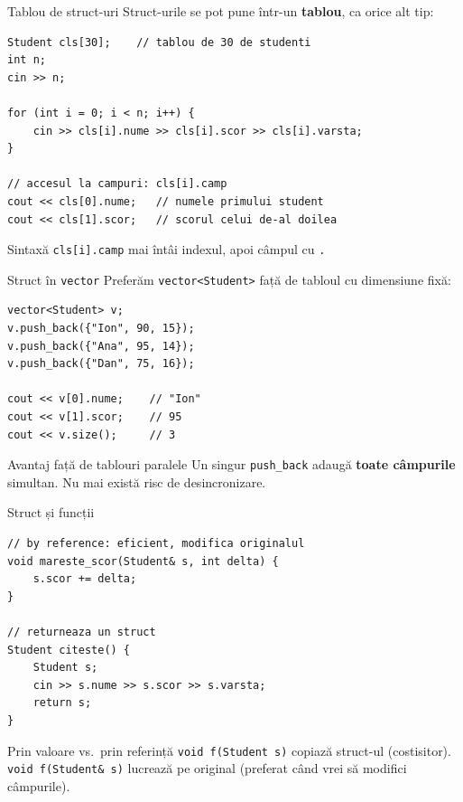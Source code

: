 ﻿\documentclass{beamer}
\begin{document}
\begin{frame}[fragile]{Tablou de struct-uri}
  Struct-urile se pot pune într-un \textbf{tablou}, ca orice alt tip:

  \begin{lstlisting}
Student cls[30];    // tablou de 30 de studenti
int n;
cin >> n;

for (int i = 0; i < n; i++) {
    cin >> cls[i].nume >> cls[i].scor >> cls[i].varsta;
}

// accesul la campuri: cls[i].camp
cout << cls[0].nume;   // numele primului student
cout << cls[1].scor;   // scorul celui de-al doilea
  \end{lstlisting}

  \begin{block}{Sintaxă}
    \texttt{cls[i].camp} \textemdash{} mai întâi indexul,
    apoi câmpul cu \texttt{.}
  \end{block}
\end{frame}

\begin{frame}[fragile]{Struct în \texttt{vector}}
  Preferăm \texttt{vector<Student>} față de tabloul cu dimensiune fixă:

  \begin{lstlisting}
vector<Student> v;
v.push_back({"Ion", 90, 15});
v.push_back({"Ana", 95, 14});
v.push_back({"Dan", 75, 16});

cout << v[0].nume;    // "Ion"
cout << v[1].scor;    // 95
cout << v.size();     // 3
  \end{lstlisting}

  \begin{block}{Avantaj față de tablouri paralele}
    Un singur \texttt{push\_back} adaugă \textbf{toate câmpurile} simultan.
    Nu mai există risc de desincronizare.
  \end{block}
\end{frame}

\begin{frame}[fragile]{Struct și funcții}
  \begin{lstlisting}
// by reference: eficient, modifica originalul
void mareste_scor(Student& s, int delta) {
    s.scor += delta;
}

// returneaza un struct
Student citeste() {
    Student s;
    cin >> s.nume >> s.scor >> s.varsta;
    return s;
}
  \end{lstlisting}

  \begin{block}{Prin valoare vs.\ prin referință}
    \texttt{void f(Student s)} \textemdash{} copiază struct-ul (costisitor). \\
    \texttt{void f(Student\& s)} \textemdash{} lucrează pe original
    (preferat când vrei să modifici câmpurile).
  \end{block}
\end{frame}
\end{document}
